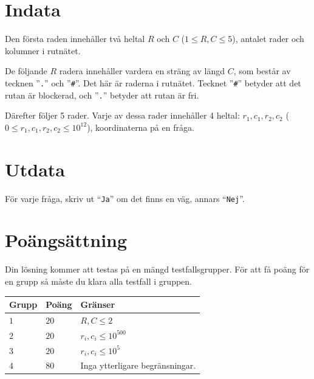 

\section*{Indata}
Den första raden innehåller två heltal $R$ och $C$ ($1 \leq R,C \leq 5$), antalet rader och kolumner i rutnätet.

De följande $R$ radera innehåller vardera en sträng av längd $C$, som består av tecknen ''\verb|.|'' och ''\verb|#|''.
Det här är raderna i rutnätet. Tecknet ''\verb|#|'' betyder att det rutan är blockerad, och
''\verb|.|'' betyder att rutan är fri.

Därefter följer 5 rader. Varje av dessa rader innehåller 4 heltal: $r_1, c_1, r_2, c_2$ ($0 \leq r_1, c_1, r_2, c_2 \leq 10^12$),
koordinaterna på en fråga.

\section*{Utdata}
För varje fråga, skriv ut ``\texttt{Ja}'' om det finns en väg, annars ``\texttt{Nej}''.

\section*{Poängsättning}
Din lösning kommer att testas på en mängd testfallsgrupper.
För att få poäng för en grupp så måste du klara alla testfall i gruppen.

\noindent
\begin{tabular}{| l | l | p{12cm} |}
  \hline
  \textbf{Grupp} & \textbf{Poäng} & \textbf{Gränser} \\ \hline
  $1$    & $20$  & $R, C \leq 2$ \\ \hline %
  $2$    & $20$  & $r_i, c_i \leq 10^500$ \\ \hline %
  $3$    & $20$  & $r_i, c_i \leq 10^5$ \\ \hline %
  $4$    & $80$  & Inga ytterligare begränsningar. \\ \hline
\end{tabular}

